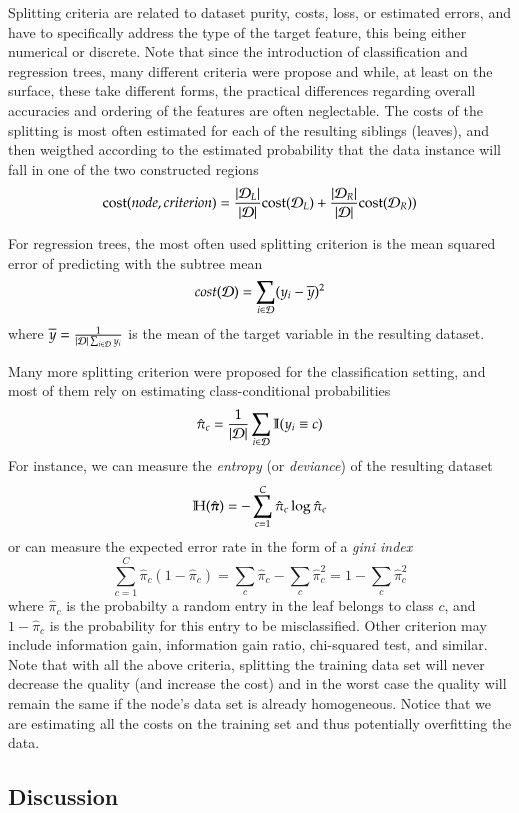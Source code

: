 Splitting criteria are related to dataset purity, costs, loss, or estimated errors, and have to specifically address the type of the target feature, this being either numerical or discrete. Note that since the introduction of classification and regression trees, many different criteria were propose and while, at least on the surface, these take different forms, the practical differences regarding overall accuracies and ordering of the features are often neglectable. The costs of the splitting is most often estimated for each of the resulting siblings (leaves), and then weigthed according to the estimated probability that the data instance will fall in one of the two constructed regions
$$ {\rm cost}(node, criterion) = {|\mathcal{D}_L|\over |\mathcal{D}|}{\rm cost}(\mathcal{D}_L) + {|\mathcal{D}_R|\over |\mathcal{D}|}{\rm cost}(\mathcal{D}_R)) $$

For regression trees, the most often used splitting criterion is the mean squared error of predicting with the subtree mean
$$ cost(\mathcal{D}) = \sum_{i\in\mathcal{D}}(y_i-\overline{y})^2 $$
where $\overline{y} = {1\over|\mathcal{D}|\sum_{i\in\mathcal{D}}y_i}$ is the mean of the target variable in the resulting dataset.

Many more splitting criterion were proposed for the classification setting, and most of them rely on estimating class-conditional probabilities
$$ \hat{\pi}_c = {1\over|\mathcal{D}|}\sum_{i\in\mathcal{D}}\mathbb{I}(y_i\equiv c) $$
For instance, we can measure the {\em entropy} (or {\em deviance}) of the resulting dataset
$$ \mathbb{H}(\hat{\boldsymbol{\pi}}) = -\sum_{c=1}^C \hat{\pi}_c \log \hat{\pi}_c $$
or can measure the expected error rate in the form of a {\em gini index}
$$ \sum_{c=1}^C \hat{\pi}_c (1-\hat{\pi}_c) = \sum_c \hat{\pi}_c - \sum_c \hat{\pi}_c^2 = 1 - \sum_c \hat{\pi}_c^2 $$
where $\hat{\pi}_c$ is the probabilty a random entry in the leaf belongs to class $c$, and $1-\hat{\pi}_c$ is the probability for this entry to be misclassified. Other criterion may include information gain, information gain ratio, chi-squared test, and similar. Note that with all the above criteria, splitting the training data set will never decrease the quality (and increase the cost) and in the worst case the quality will remain the same if the node's data set is already homogeneous. Notice that we are estimating all the costs on the training set and thus potentially overfitting the data.

\subsection*{Discussion}

